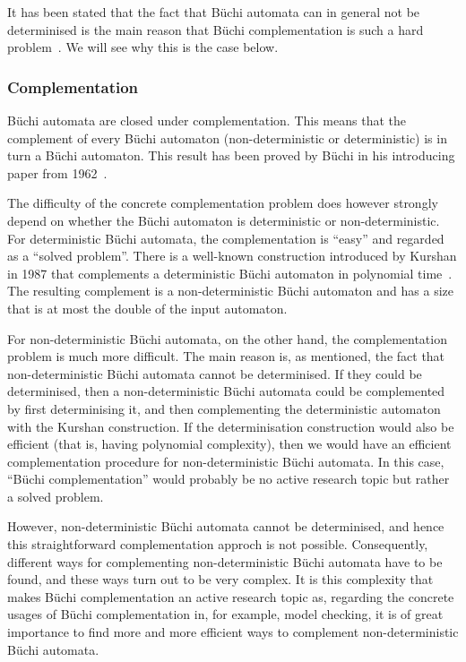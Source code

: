 It has been stated that the fact that Büchi automata can in general not be determinised is the main reason that Büchi complementation is such a hard problem~\cite{niessner1997deterministic}. We will see why this is the case below.


\subsubsection{Complementation}
Büchi automata are closed under complementation. This means that the complement of every Büchi automaton (non-deterministic or deterministic) is in turn a Büchi automaton. This result has been proved by Büchi in his introducing paper from 1962~\cite{buchi1960decision}.

The difficulty of the concrete complementation problem does however strongly depend on whether the Büchi automaton is deterministic or non-deterministic. For deterministic Büchi automata, the complementation is ``easy'' and regarded as a ``solved problem''. There is a well-known construction introduced by Kurshan in 1987 that complements a deterministic Büchi automaton in polynomial time~\cite{Kurshan198759}. The resulting complement is a non-deterministic Büchi automaton and has a size that is at most the double of the input automaton.

For non-deterministic Büchi automata, on the other hand, the complementation problem is much more difficult. The main reason is, as mentioned, the fact that non-deterministic Büchi automata cannot be determinised. If they could be determinised, then a non-deterministic Büchi automata could be complemented by first determinising it, and then complementing the deterministic automaton with the Kurshan construction. If the determinisation construction would also be efficient (that is, having polynomial complexity), then we would have an efficient complementation procedure for non-deterministic Büchi automata. In this case, ``Büchi complementation'' would probably be no active research topic but rather a solved problem.

However, non-deterministic Büchi automata cannot be determinised, and hence this straightforward complementation approch is not possible. Consequently, different ways for complementing non-deterministic Büchi automata have to be found, and these ways turn out to be very complex. It is this complexity that makes Büchi complementation an active research topic as, regarding the concrete usages of Büchi complementation in, for example, model checking, it is of great importance to find more and more efficient ways to complement non-deterministic Büchi automata. 


